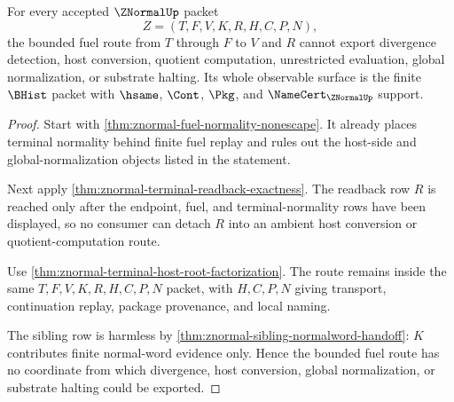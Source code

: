 \begin{theorem}
\label{thm:znormal-root-fuel-route-nonescape}
For every accepted $\ZNormalUp$ packet
$$
Z=(T,F,V,K,R,H,C,P,N),
$$
the bounded fuel route from $T$ through $F$ to $V$ and $R$ cannot export
divergence detection, host conversion, quotient computation, unrestricted
evaluation, global normalization, or substrate halting. Its whole observable
surface is the finite $\BHist$ packet with $\hsame$, $\Cont$, $\Pkg$, and
$\NameCert_{\ZNormalUp}$ support.
\end{theorem}
\begin{proof}
Start with \autoref{thm:znormal-fuel-normality-nonescape}. It already places
terminal normality behind finite fuel replay and rules out the host-side and
global-normalization objects listed in the statement.

Next apply \autoref{thm:znormal-terminal-readback-exactness}. The readback row
$R$ is reached only after the endpoint, fuel, and terminal-normality rows have
been displayed, so no consumer can detach $R$ into an ambient host conversion
or quotient-computation route.

Use \autoref{thm:znormal-terminal-host-root-factorization}. The route remains
inside the same $T,F,V,K,R,H,C,P,N$ packet, with $H,C,P,N$ giving transport,
continuation replay, package provenance, and local naming.

The sibling row is harmless by \autoref{thm:znormal-sibling-normalword-handoff}:
$K$ contributes finite normal-word evidence only. Hence the bounded fuel route
has no coordinate from which divergence, host conversion, global
normalization, or substrate halting could be exported.
\end{proof}

